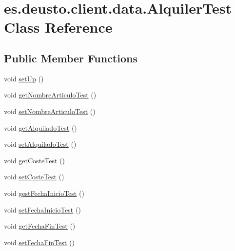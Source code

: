 \hypertarget{classes_1_1deusto_1_1client_1_1data_1_1_alquiler_test}{}\section{es.\+deusto.\+client.\+data.\+Alquiler\+Test Class Reference}
\label{classes_1_1deusto_1_1client_1_1data_1_1_alquiler_test}
\subsection*{Public Member Functions}
\begin{DoxyCompactItemize}
\item 
void \mbox{\hyperlink{classes_1_1deusto_1_1client_1_1data_1_1_alquiler_test_a54aa3c5aea0bf4d3b0024f5e15c7ffb7}{set\+Up}} ()
\item 
void \mbox{\hyperlink{classes_1_1deusto_1_1client_1_1data_1_1_alquiler_test_a04d84fa2e3839e8f8f3d222ea10dc1e6}{get\+Nombre\+Articulo\+Test}} ()
\item 
void \mbox{\hyperlink{classes_1_1deusto_1_1client_1_1data_1_1_alquiler_test_a9b67f35eb992137be4d8ab2aaf213f55}{set\+Nombre\+Articulo\+Test}} ()
\item 
void \mbox{\hyperlink{classes_1_1deusto_1_1client_1_1data_1_1_alquiler_test_a064b5d30a6c7a261613ed69b83f0808e}{get\+Alquilado\+Test}} ()
\item 
void \mbox{\hyperlink{classes_1_1deusto_1_1client_1_1data_1_1_alquiler_test_acfd505257f018ad9fbbbbe6bf6ed0403}{set\+Alquilado\+Test}} ()
\item 
void \mbox{\hyperlink{classes_1_1deusto_1_1client_1_1data_1_1_alquiler_test_a1a9be7198984a7dede92c84b07f79865}{get\+Coste\+Test}} ()
\item 
void \mbox{\hyperlink{classes_1_1deusto_1_1client_1_1data_1_1_alquiler_test_aeec004c4129119fb77df92dca7fd84c0}{set\+Coste\+Test}} ()
\item 
void \mbox{\hyperlink{classes_1_1deusto_1_1client_1_1data_1_1_alquiler_test_a85465949ee1fb4afa44207614b860d89}{gest\+Fecha\+Inicio\+Test}} ()
\item 
void \mbox{\hyperlink{classes_1_1deusto_1_1client_1_1data_1_1_alquiler_test_a6e678ae775991bef90f934b4a7803c5e}{set\+Fecha\+Inicio\+Test}} ()
\item 
void \mbox{\hyperlink{classes_1_1deusto_1_1client_1_1data_1_1_alquiler_test_ae66a32c9135a620074aa2f7dbbc34f35}{get\+Fecha\+Fin\+Test}} ()
\item 
void \mbox{\hyperlink{classes_1_1deusto_1_1client_1_1data_1_1_alquiler_test_a3b4b6c7321ef85948e3c82fda57c826d}{set\+Fecha\+Fin\+Test}} ()

\end{DoxyCompactItemize}

